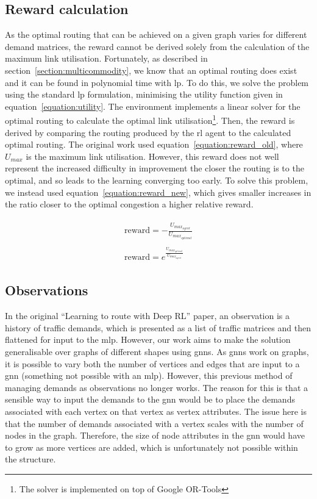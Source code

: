 \subsection{Reward calculation}
As the optimal routing that can be achieved on a given graph varies for different demand matrices, the reward cannot be derived solely from the calculation of the maximum link utilisation. Fortunately, as described in section~\ref{section:multicommodity}, we know that an optimal routing does exist and it can be found in polynomial time with \ac{lp}. To do this, we solve the problem using the standard \ac{lp} formulation, minimising the utility function given in equation~\ref{equation:utility}. The environment implements a linear solver for the optimal routing to calculate the optimal link utilisation\footnote{The solver is implemented on top of Google OR-Tools\cite{ortools}}. Then, the reward is derived by comparing the routing produced by the \ac{rl} agent to the calculated optimal routing. The original work used equation~\ref{equation:reward_old}, where $U_{max}$ is the maximum link utilisation. However, this reward does not well represent the increased difficulty in improvement the closer the routing is to the optimal, and so leads to the learning converging too early. To solve this problem, we instead used equation~\ref{equation:reward_new}, which gives smaller increases in the ratio closer to the optimal congestion a higher relative reward.

\begin{align}
  \begin{split}
    \label{equation:reward_old}
    \mathrm{reward} = -\frac{U_{max_{agent}}}{U_{max_{optimal}}}
  \end{split}\\
  \begin{split}
    \label{equation:reward_new}
    \mathrm{reward} = e^{\frac{U_{max_{optimal}}}{U_{max_{agent}}}}
  \end{split}
\end{align}


\subsection{Observations}
In the original \enquote{Learning to route with Deep RL} paper, an observation is a history of traffic demands, which is presented as a list of traffic matrices and then flattened for input to the \ac{mlp}. However, our work aims to make the solution generalisable over graphs of different shapes using \acp{gnn}. As \acp{gnn} work on graphs, it is possible to vary both the number of vertices and edges that are input to a \ac{gnn} (something not possible with an \ac{mlp}). However, this previous method of managing demands as observations no longer works. The reason for this is that a sensible way to input the demands to the \ac{gnn} would be to place the demands associated with each vertex on that vertex as vertex attributes. The issue here is that the number of demands associated with a vertex scales with the number of nodes in the graph. Therefore, the size of node attributes in the \ac{gnn} would have to grow as more vertices are added, which is unfortunately not possible within the structure.

